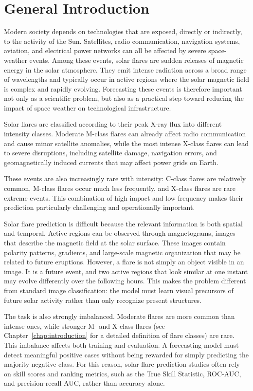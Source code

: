 \anglais

\chapter*{General Introduction}
\label{chap:general_introduction}

Modern society depends on technologies that are exposed, directly or indirectly, to the activity of the Sun. Satellites, radio communication, navigation systems, aviation, and electrical power networks can all be affected by severe space-weather events. Among these events, solar flares are sudden releases of magnetic energy in the solar atmosphere. They emit intense radiation across a broad range of wavelengths and typically occur in active regions where the solar magnetic field is complex and rapidly evolving. Forecasting these events is therefore important not only as a scientific problem, but also as a practical step toward reducing the impact of space weather on technological infrastructure.

Solar flares are classified according to their peak X-ray flux into different intensity classes. Moderate M-class flares can already affect radio communication and cause minor satellite anomalies, while the most intense X-class flares can lead to severe disruptions, including satellite damage, navigation errors, and geomagnetically induced currents that may affect power grids on Earth.

These events are also increasingly rare with intensity: C-class flares are relatively common, M-class flares occur much less frequently, and X-class flares are rare extreme events. This combination of high impact and low frequency makes their prediction particularly challenging and operationally important.

Solar flare prediction is difficult because the relevant information is both spatial and temporal. Active regions can be observed through magnetograms, images that describe the magnetic field at the solar surface. These images contain polarity patterns, gradients, and large-scale magnetic organization that may be related to future eruptions. However, a flare is not simply an object visible in an image. It is a future event, and two active regions that look similar at one instant may evolve differently over the following hours. This makes the problem different from standard image classification: the model must learn visual precursors of future solar activity rather than only recognize present structures.

The task is also strongly imbalanced. Moderate flares are more common than intense ones, while stronger M- and X-class flares (see Chapter~\ref{chap:introduction} for a detailed definition of flare classes) are rare. This imbalance affects both training and evaluation. A forecasting model must detect meaningful positive cases without being rewarded for simply predicting the majority negative class. For this reason, solar flare prediction studies often rely on skill scores and ranking metrics, such as the True Skill Statistic, ROC-AUC, and precision-recall AUC, rather than accuracy alone.

